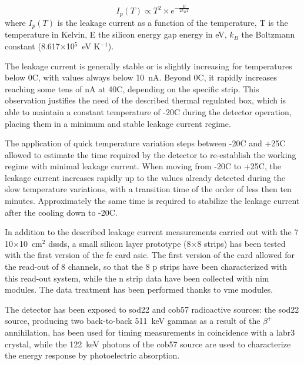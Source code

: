 \begin{equation}
I_p(T) \propto T^2 \times e^{-\frac{E}{2k_{B}T}}
\label{chap3::eq::leakCurrentTemp}
\end{equation}  
where $I_{p}(T)$ is the leakage current as a function of the temperature, T is the temperature in Kelvin, E the silicon energy gap energy in eV, $k_B$ the Boltzmann constant (8.617$\times$10$^{5}$~eV K$^{-1}$).


The leakage current is generally stable or is slightly increasing for temperatures below 0\textdegree{}C, with values always below 10~nA. Beyond 0\textdegree{}C, it rapidly increases reaching some tens of nA at 40\textdegree{}C, depending on the specific strip. This observation justifies the need of the described thermal regulated box, which is able to maintain a constant temperature of -20\textdegree{}C during the detector operation, placing them in a minimum and stable leakage current regime.

The application of quick temperature variation steps between -20\textdegree{}C and +25\textdegree{}C allowed to estimate the time required by the detector to re-establish the working regime with minimal leakage current. When moving from -20\textdegree{}C to +25\textdegree{}C, the leakage current increases rapidly up to the values already detected during the slow temperature variations, with a transition time of the order of less then ten minutes. Approximately the same time is required to stabilize the leakage current after the cooling down to -20\textdegree{}C.

In addition to the described leakage current measurements carried out with the 7 10$\times$10~cm$^{2}$ \glspl{dssd}, a small silicon layer prototype (8$\times$8 strips) has been tested with the first version of the \gls{fe} card \gls{asic}. The first version of the card allowed for the read-out of 8 channels, so that the 8 p strips have been characterized with this read-out system, while the n strip data have been collected with \gls{nim} modules. The data treatment has been performed thanks to \gls{vme} modules.

The detector has been exposed to \gls{sod22} and \gls{cob57} radioactive sources: the \gls{sod22} source, producing two back-to-back 511~keV gammas as a result of the $\beta^{+}$ annihilation, has been used for timing measurements in coincidence with a \gls{labr3} crystal, while the 122~keV photons of the \gls{cob57} source are used to characterize the energy response by photoelectric absorption.

